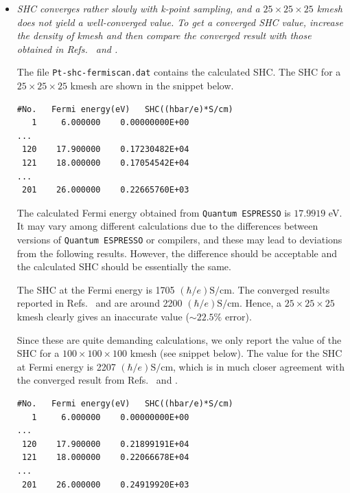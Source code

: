 \begin{itemize}
	\item {\it SHC converges rather slowly with k-point sampling, and a $25 \times 25 \times 25$ kmesh does not yield a well-converged value.
	To get a converged SHC value, increase the density of kmesh and 
	then compare the converged result with those obtained in 
	Refs.~ and .}

	The file {\tt Pt-shc-fermiscan.dat} contains the calculated SHC. 
	The SHC for a $25\times25\times25$ kmesh are shown in the snippet below. 
	 
\begin{tcolorbox}[title=$25\times25\times25$ kmesh,sharp corners,boxrule=0.5pt]
{\small
\begin{verbatim}
#No.   Fermi energy(eV)   SHC((hbar/e)*S/cm)
   1     6.000000    0.00000000E+00
...
 120    17.900000    0.17230482E+04
 121    18.000000    0.17054542E+04
...
 201    26.000000    0.22665760E+03
\end{verbatim}
}
\end{tcolorbox}

The calculated Fermi energy obtained from {\tt Quantum ESPRESSO} is $17.9919$ eV. 
It may vary among different calculations due to the differences between versions of {\tt Quantum ESPRESSO} or compilers, 
and these may lead to deviations from the following results. 
However, the difference should be acceptable and the calculated SHC should be essentially the same. 

The SHC at the Fermi energy is 1705 $(\hbar/e)\mathrm{S/cm}$. 
The converged results reported in Refs.~ 
and  are around 2200 $(\hbar/e)\mathrm{S/cm}$. 
Hence, a $25\times25\times25$ kmesh clearly gives an inaccurate value ($\sim 22.5\%$ error).

Since these are quite demanding calculations, we only report the 
value of the SHC for a $100\times100\times100$ kmesh (see snippet below). 
The value for the SHC at Fermi energy is 2207 $(\hbar/e)\mathrm{S/cm}$, which is 
in much closer agreement with the converged result from 
Refs.~ and .

\begin{tcolorbox}[title=$100\times100\times100$ kmesh,sharp corners,boxrule=0.5pt]
{\small
\begin{verbatim}
#No.   Fermi energy(eV)   SHC((hbar/e)*S/cm)
   1     6.000000    0.00000000E+00
...
 120    17.900000    0.21899191E+04
 121    18.000000    0.22066678E+04
...
 201    26.000000    0.24919920E+03
\end{verbatim}
}
\end{tcolorbox}


\end{itemize}

